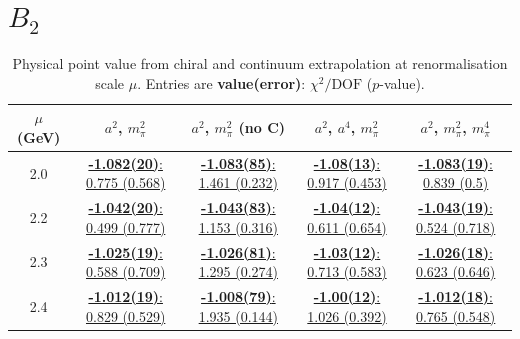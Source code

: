 \documentclass[12pt]{extarticle}
\begin{document}
\section{$B_2$}
\begin{table}[h!]
\begin{center}
\begin{tabular}{|c|c|c|c|c|}
\hline
$\mu$ (GeV) & $a^2$, $m_\pi^2$& $a^2$, $m_\pi^2$ (no C)& $a^2$, $a^4$, $m_\pi^2$& $a^2$, $m_\pi^2$, $m_\pi^4$\\
\hline
2.0& \hyperlink{VVmAA/NPR/a2m2_20.pdf.1}{\textbf{-1.082(20)}: 0.775 (0.568)} & \hyperlink{VVmAA/NPR/a2m2noC_20.pdf.1}{\textbf{-1.083(85)}: 1.461 (0.232)} & \hyperlink{VVmAA/NPR/a2a4m2_20.pdf.1}{\textbf{-1.08(13)}: 0.917 (0.453)} & \hyperlink{VVmAA/NPR/a2m2m4_20.pdf.1}{\textbf{-1.083(19)}: 0.839 (0.5)}\\
2.2& \hyperlink{VVmAA/NPR/a2m2_22.pdf.1}{\textbf{-1.042(20)}: 0.499 (0.777)} & \hyperlink{VVmAA/NPR/a2m2noC_22.pdf.1}{\textbf{-1.043(83)}: 1.153 (0.316)} & \hyperlink{VVmAA/NPR/a2a4m2_22.pdf.1}{\textbf{-1.04(12)}: 0.611 (0.654)} & \hyperlink{VVmAA/NPR/a2m2m4_22.pdf.1}{\textbf{-1.043(19)}: 0.524 (0.718)}\\
2.3& \hyperlink{VVmAA/NPR/a2m2_23.pdf.1}{\textbf{-1.025(19)}: 0.588 (0.709)} & \hyperlink{VVmAA/NPR/a2m2noC_23.pdf.1}{\textbf{-1.026(81)}: 1.295 (0.274)} & \hyperlink{VVmAA/NPR/a2a4m2_23.pdf.1}{\textbf{-1.03(12)}: 0.713 (0.583)} & \hyperlink{VVmAA/NPR/a2m2m4_23.pdf.1}{\textbf{-1.026(18)}: 0.623 (0.646)}\\
2.4& \hyperlink{VVmAA/NPR/a2m2_24.pdf.1}{\textbf{-1.012(19)}: 0.829 (0.529)} & \hyperlink{VVmAA/NPR/a2m2noC_24.pdf.1}{\textbf{-1.008(79)}: 1.935 (0.144)} & \hyperlink{VVmAA/NPR/a2a4m2_24.pdf.1}{\textbf{-1.00(12)}: 1.026 (0.392)} & \hyperlink{VVmAA/NPR/a2m2m4_24.pdf.1}{\textbf{-1.012(18)}: 0.765 (0.548)}\\
\hline
\end{tabular}
\caption{Physical point value from chiral and continuum extrapolation at renormalisation scale $\mu$. Entries are \textbf{value(error)}: $\chi^2/\text{DOF}$ ($p$-value).}
\end{center}
\end{table}
\end{document}
